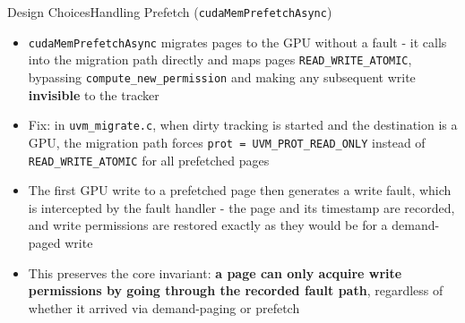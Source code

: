 \begin{frame}{Design Choices}{Handling Prefetch (\texttt{cudaMemPrefetchAsync})}
\begin{itemize}[<+->]
    \item \texttt{cudaMemPrefetchAsync} migrates pages to the GPU without a fault - it calls into the migration path directly and maps pages \texttt{READ\_WRITE\_ATOMIC}, bypassing \texttt{compute\_new\_permission} and making any subsequent write \textbf{invisible} to the tracker
    \item Fix: in \texttt{uvm\_migrate.c}, when dirty tracking is started and the destination is a GPU, the migration path forces \texttt{prot = UVM\_PROT\_READ\_ONLY} instead of \texttt{READ\_WRITE\_ATOMIC} for all prefetched pages
    \item The first GPU write to a prefetched page then generates a write fault, which is intercepted by the fault handler - the page and its timestamp are recorded, and write permissions are restored exactly as they would be for a demand-paged write
    \item This preserves the core invariant: \textbf{a page can only acquire write permissions by going through the recorded fault path}, regardless of whether it arrived via demand-paging or prefetch
\end{itemize}
\end{frame}


